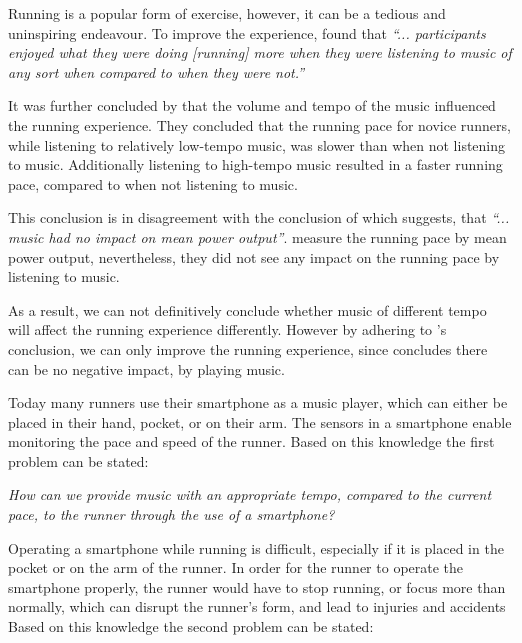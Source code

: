 Running is a popular form of exercise, however, it can be a tedious and uninspiring endeavour.
To improve the experience, \citet{musicRunEffectArticle} found that 
\textit{``... participants enjoyed what they were doing [running] more when they were listening to music of any sort when compared to when they were not.''}

It was further concluded by \citet{musicRunEffectArticle} that the volume and tempo of the music influenced the running experience.
They concluded that the running pace for novice runners, while listening to relatively low-tempo music, was slower than when not listening to music. Additionally listening to high-tempo music resulted in a faster running pace, compared to when not listening to music.

This conclusion is in disagreement with the conclusion of \citet{musicNoPerformanceEffect} which suggests, that \textit{``... music had no impact on mean power output''}. \citet{musicNoPerformanceEffect} measure the running pace by mean power output, nevertheless, they did not see any impact on the running pace by listening to music.

As a result, we can not definitively conclude whether music of different tempo will affect the running experience differently. 
However by adhering to \citet{musicRunEffectArticle}'s conclusion, we can only improve the running experience, since \citet{musicNoPerformanceEffect} concludes there can be no negative impact, by playing music.

Today many runners use their smartphone as a music player, which can either be placed in their hand, pocket, or on their arm.
The sensors in a smartphone enable monitoring the pace and speed of the runner.
Based on this knowledge the first problem can be stated:

\begin{center}
\textit{How can we provide music with an appropriate tempo, compared to the current pace, to the runner through the use of a smartphone?}
\end{center}

\noindent Operating a smartphone while running is difficult, especially if it is placed in the pocket or on the arm of the runner.
In order for the runner to operate the smartphone properly, the runner would have to stop running, or focus more than normally, which can disrupt the runner's form, and lead to injuries and accidents
Based on this knowledge the second problem can be stated: 

